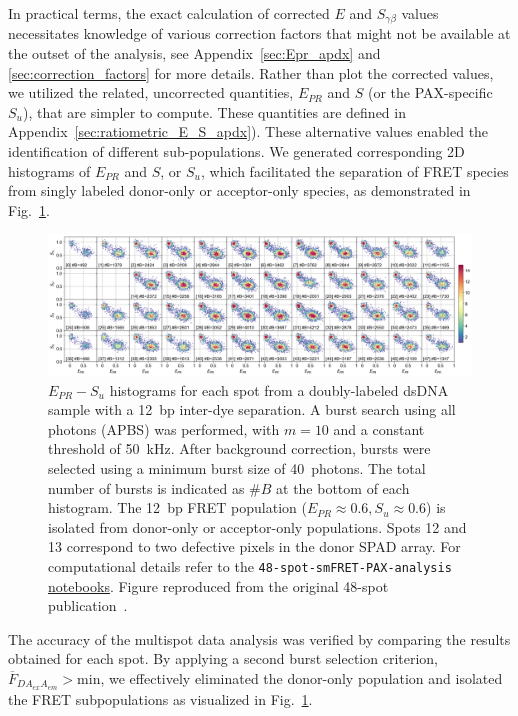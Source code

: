 In practical terms, the exact calculation of corrected $E$ and $S_{\gamma\beta}$ values necessitates knowledge of various correction factors that might not be available at the outset of the analysis, see Appendix~\ref{sec:Epr_apdx} and \ref{sec:correction_factors} for more details. 
Rather than plot the corrected values, we utilized the related, uncorrected quantities, $E_{PR}$ and $S$ (or the \ac{PAX}-specific $S_u$), that are simpler to compute.
These quantities are defined in Appendix~\ref{sec:ratiometric_E_S_apdx}). 
These alternative values enabled the identification of different sub-populations. 
We generated corresponding 2D histograms of $E_{PR}$ and $S$, or $S_u$, which facilitated the separation of FRET species from singly labeled donor-only or acceptor-only species, as demonstrated in Fig.~\ref{fig:48-spot_FRET_pop}.

\begin{figure}
\centering\includegraphics[width=1.0\linewidth]{chapters/figures/2017-05-23_08_12d_48spot_alex_hist_Su_all-bursts.png}
\caption{\label{fig:48-spot_FRET_pop} $E_{PR} - S_u$ histograms for each 
spot from a doubly-labeled \ac{dsDNA} sample with a 12~\ac{bp} inter-dye separation. 
A burst search using all photons (\ac{APBS}) was performed, with $m=10$ and a constant threshold of 50~kHz.
After background correction, bursts were selected using a minimum burst size of 40~photons.
The total number of bursts is indicated as $\#B$ at the bottom of each histogram.  
The 12~\ac{bp} FRET population ($E_{PR} \approx 0.6, S_u \approx 0.6$) is isolated from donor-only or acceptor-only populations.
Spots 12 and 13 correspond to two defective pixels in the donor \ac{SPAD} array.
For computational details refer to the \texttt{48-spot-smFRET-PAX-analysis}  
\href{https://github.com/tritemio/48-spot-smFRET-PAX-analysis}{notebooks}.
Figure reproduced from the original 48-spot publication~\cite{ingargiola_JCP_2018}.
}
\end{figure}

The accuracy of the multispot data analysis was verified by comparing the results obtained for each spot. 
By applying a second burst selection criterion, $\overline{F}_{DA_{ex}A_{em}} > \text{min}$, we effectively eliminated the donor-only population and isolated the FRET subpopulations as visualized in Fig.~\ref{fig:48-spot_FRET_pop}. 

